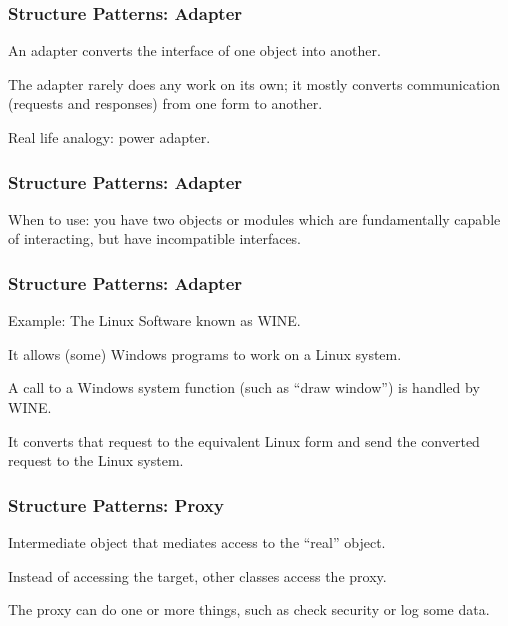 \begin{frame}
\frametitle{Structure Patterns: Adapter}
\begin{changemargin}{1cm}
An adapter converts the interface of one object into another.

The adapter rarely does any work on its own; it mostly converts communication (requests and responses) from one form to another.

Real life analogy: power adapter.

\end{changemargin}
\end{frame}


\begin{frame}
\frametitle{Structure Patterns: Adapter}
\begin{changemargin}{1cm}

When to use: you have two objects or modules which are fundamentally capable of interacting, but have incompatible interfaces.

\end{changemargin}
\end{frame}

\begin{frame}
\frametitle{Structure Patterns: Adapter}
\begin{changemargin}{1cm}

Example: The Linux Software known as WINE. 

It allows (some) Windows programs to work on a Linux system. 

A call to a Windows system function (such as ``draw window'') is handled by WINE.

It converts that request to the equivalent Linux form and send the converted request to the Linux system. 

\end{changemargin}
\end{frame}

\begin{frame}
\frametitle{Structure Patterns: Proxy}
\begin{changemargin}{1cm}

Intermediate object that mediates access to the ``real'' object.

Instead of accessing the target, other classes access the proxy.

The proxy can do one or more things, such as check security or log some data.

\end{changemargin}
\end{frame}

